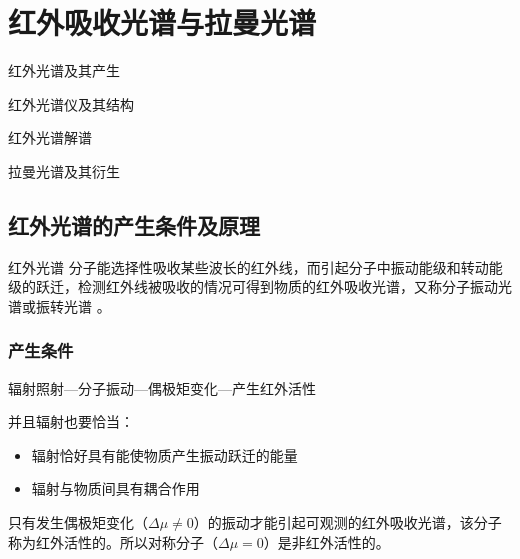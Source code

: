 \chapter{红外吸收光谱与拉曼光谱}
\begin{introduction}
    \item 红外光谱及其产生
    \item 红外光谱仪及其结构
    \item 红外光谱解谱
    \item 拉曼光谱及其衍生
\end{introduction}
\section{红外光谱的产生条件及原理}
\begin{definition*}{红外光谱}
    分子能选择性吸收某些波长的红外线，而引起分子中振动能级和转动能级的跃迁，检测红外线被吸收的情况可得到物质的红外吸收光谱，又称分子振动光谱或振转光谱 。
\end{definition*}
\subsection{产生条件}
辐射照射---分子振动---偶极矩变化---产生红外活性

并且辐射也要恰当：
\begin{itemize}
    \item 辐射恰好具有能使物质产生振动跃迁的能量
    \item 辐射与物质间具有耦合作用
\end{itemize}
\begin{note}
    只有发生偶极矩变化（$\Delta \mu \neq 0$）的振动才能引起可观测的红外吸收光谱，该分子称为红外活性的。所以对称分子（$\Delta \mu=0$）是非红外活性的。
\end{note}
